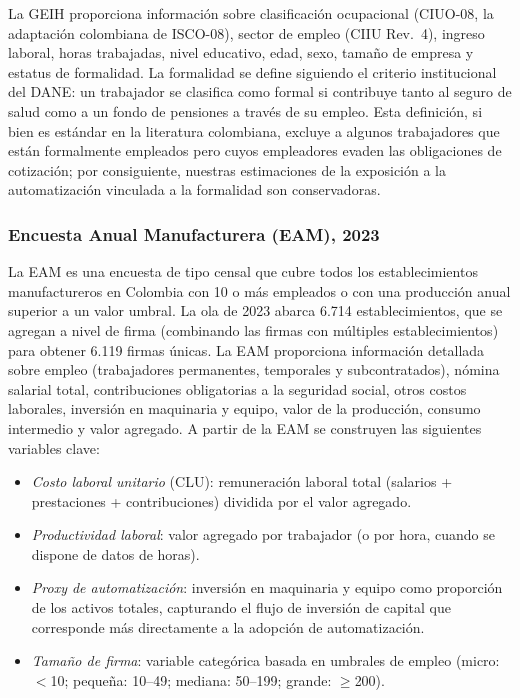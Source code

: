 \documentclass{article}
\begin{document}
La GEIH proporciona informaci\'on sobre clasificaci\'on ocupacional (CIUO-08, la adaptaci\'on colombiana de ISCO-08), sector de empleo (CIIU Rev.\ 4), ingreso laboral, horas trabajadas, nivel educativo, edad, sexo, tama\~no de empresa y estatus de formalidad. La formalidad se define siguiendo el criterio institucional del DANE: un trabajador se clasifica como formal si contribuye tanto al seguro de salud como a un fondo de pensiones a trav\'es de su empleo. Esta definici\'on, si bien es est\'andar en la literatura colombiana, excluye a algunos trabajadores que est\'an formalmente empleados pero cuyos empleadores evaden las obligaciones de cotizaci\'on; por consiguiente, nuestras estimaciones de la exposici\'on a la automatizaci\'on vinculada a la formalidad son conservadoras.

\subsubsection*{Encuesta Anual Manufacturera (EAM), 2023}

La EAM es una encuesta de tipo censal que cubre todos los establecimientos manufactureros en Colombia con 10 o m\'as empleados o con una producci\'on anual superior a un valor umbral. La ola de 2023 abarca 6.714 establecimientos, que se agregan a nivel de firma (combinando las firmas con m\'ultiples establecimientos) para obtener 6.119 firmas \'unicas. La EAM proporciona informaci\'on detallada sobre empleo (trabajadores permanentes, temporales y subcontratados), n\'omina salarial total, contribuciones obligatorias a la seguridad social, otros costos laborales, inversi\'on en maquinaria y equipo, valor de la producci\'on, consumo intermedio y valor agregado. A partir de la EAM se construyen las siguientes variables clave:

\begin{itemize}[nosep]
\item \textit{Costo laboral unitario} (CLU): remuneraci\'on laboral total (salarios + prestaciones + contribuciones) dividida por el valor agregado.
\item \textit{Productividad laboral}: valor agregado por trabajador (o por hora, cuando se dispone de datos de horas).
\item \textit{Proxy de automatizaci\'on}: inversi\'on en maquinaria y equipo como proporci\'on de los activos totales, capturando el flujo de inversi\'on de capital que corresponde m\'as directamente a la adopci\'on de automatizaci\'on.
\item \textit{Tama\~no de firma}: variable categ\'orica basada en umbrales de empleo (micro: $<$10; peque\~na: 10--49; mediana: 50--199; grande: $\geq$200).
\end{itemize}
\end{document}

